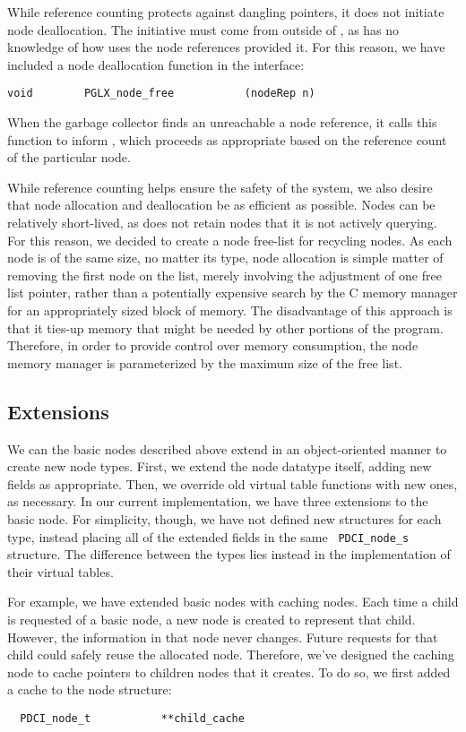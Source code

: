 \documentclass{article}
\begin{document}
While reference counting protects against dangling pointers, it does
not initiate node deallocation.  The initiative must come from outside
of \pads, as \pads has no knowledge of how \galax uses the node
references provided it. For this reason, we have included a node
deallocation function in the \pglx interface:
\begin{verbatim}
void        PGLX_node_free           (nodeRep n)
\end{verbatim}
When the \galax garbage collector finds an unreachable a node reference,
it calls this function to inform \pads, which proceeds as appropriate
based on the reference count of the particular node.

While reference counting helps ensure the safety of the system, we
also desire that node allocation and deallocation be as efficient as
possible.  Nodes can be relatively short-lived, as \galax does not
retain nodes that it is not actively querying. For this reason, we
decided to create a node free-list for recycling nodes. As each node
is of the same size, no matter its type, node allocation is simple
matter of removing the first node on the list, merely involving the
adjustment of one free list pointer, rather than a potentially
expensive search by the C memory manager for an appropriately sized
block of memory. The disadvantage of this approach is that it ties-up
memory that might be needed by other portions of the program.
Therefore, in order to provide control over memory consumption, the
node memory manager is parameterized by the maximum size of the free
list.

\subsection{Extensions}
\label{sec:node-ext}

We can the basic nodes described above extend in an object-oriented
manner to create new node types.  First, we extend the node datatype
itself, adding new fields as appropriate.  Then, we override old
virtual table functions with new ones, as necessary. In our current
implementation, we have three extensions to the basic node. For
simplicity, though, we have not defined new structures for each type,
instead placing all of the extended fields in the same {\tt
  PDCI\_node\_s} structure. The difference between the types lies
instead in the implementation of their virtual tables.

For example, we have extended basic nodes with caching nodes. Each
time a child is requested of a basic node, a new node is created to
represent that child. However, the information in that node never
changes. Future requests for that child could safely reuse the
allocated node. Therefore, we've designed the caching node to cache
pointers to children nodes that it creates.  To do so, we first added
a cache to the node structure:
\begin{verbatim}
  PDCI_node_t           **child_cache 
\end{verbatim}
\end{document}
